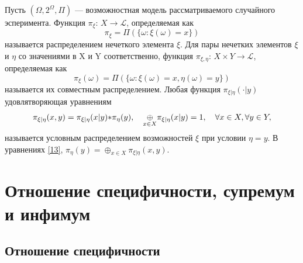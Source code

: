 \documentclass[a4paper, 14pt]{extarticle}
\newcommand\ptime{\ding{42}}
\newcommand{\pplus}{\oplus}
\begin{document}
Пусть $(\Omega, 2^{\Omega}, \Pi)$ --- возможностная модель рассматриваемого случайного эсперимента. Функция $\pi_{\xi}$: $X \to \mathcal{L}$, определяемая как
\begin{equation}
    \pi_{\xi} = \Pi(\{\omega : \xi(\omega) = x\})
\end{equation}
называется распределением нечеткого элемента $\xi$. Для пары нечетких элементов $\xi$ и $\eta$ со значениями в X и Y соответственно, функция $\pi_{\xi, \eta}$: $X \times Y \to \mathcal{L}$, определяемая как 
\begin{equation}
    \pi_{\xi}(\omega) = \Pi(\{\omega : \xi(\omega) = x, \eta(\omega) = y \})
\end{equation}
называется их совместным распределением. Любая функция $\pi_{\xi|\eta}(\cdot | y)$ удовлятворяющая уравнениям 
\begin{equation}
\label{13}
    \pi_{\xi|\eta}(x, y) = \pi_{\xi|\eta}(x|y) \ptime \pi_{\eta}(y), \quad \underset{x \in X}\pplus \pi_{\xi|\eta}(x | y) = 1, \quad \forall x \in X, \forall y \in Y,
\end{equation}
называется условным распределением возможностей $\xi$ при условии $\eta = y$. В уравнениях \ref{13}, $\pi_{\eta}(y) = \pplus_{x \in X} \pi_{\xi|\eta}(x, y)$.

\section{Отношение специфичности, супремум и инфимум}
\subsection{Отношение специфичности}


\end{document}
